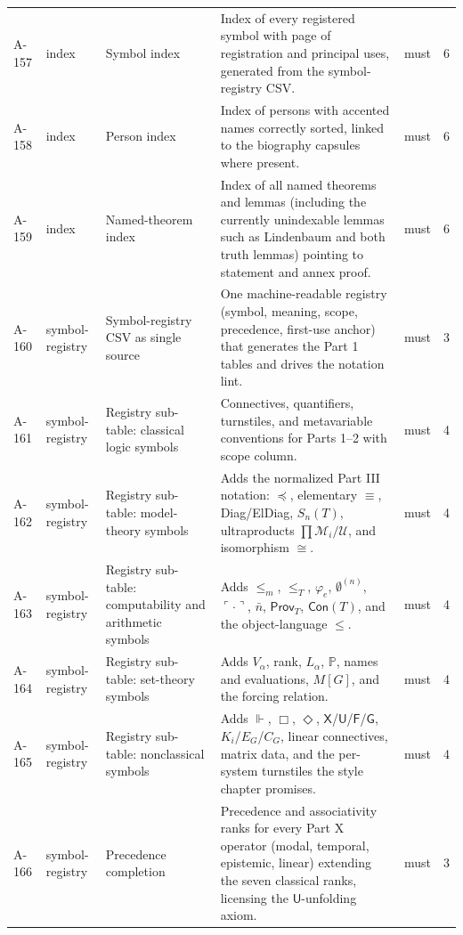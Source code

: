 \begin{longtable}{@{}p{0.45in}p{0.78in}p{2.02in}p{2.6in}p{0.42in}p{0.16in}@{}}
A-157 & index & Symbol index & Index of every registered symbol with page of registration and principal uses, generated from the symbol-registry CSV. & must & 6 \\
A-158 & index & Person index & Index of persons with accented names correctly sorted, linked to the biography capsules where present. & must & 6 \\
A-159 & index & Named-theorem index & Index of all named theorems and lemmas (including the currently unindexable lemmas such as Lindenbaum and both truth lemmas) pointing to statement and annex proof. & must & 6 \\
A-160 & symbol-registry & Symbol-registry CSV as single source & One machine-readable registry (symbol, meaning, scope, precedence, first-use anchor) that generates the Part 1 tables and drives the notation lint. & must & 3 \\
A-161 & symbol-registry & Registry sub-table: classical logic symbols & Connectives, quantifiers, turnstiles, and metavariable conventions for Parts 1--2 with scope column. & must & 4 \\
A-162 & symbol-registry & Registry sub-table: model-theory symbols & Adds the normalized Part III notation: \(\preccurlyeq\), elementary \(\equiv\), Diag/ElDiag, \(S_n(T)\), ultraproducts \(\prod\mathcal M_i/\mathcal U\), and isomorphism \(\cong\). & must & 4 \\
A-163 & symbol-registry & Registry sub-table: computability and arithmetic symbols & Adds \(\leq_m\), \(\leq_T\), \(\varphi_e\), \(\emptyset^{(n)}\), \(\ulcorner\cdot\urcorner\), \(\bar n\), \(\mathsf{Prov}_T\), \(\mathsf{Con}(T)\), and the object-language \(\leq\). & must & 4 \\
A-164 & symbol-registry & Registry sub-table: set-theory symbols & Adds \(V_\alpha\), rank, \(L_\alpha\), \(\mathbb P\), names and evaluations, \(M[G]\), and the forcing relation. & must & 4 \\
A-165 & symbol-registry & Registry sub-table: nonclassical symbols & Adds \(\Vdash\), \(\Box\), \(\Diamond\), \(\mathsf X\)/\(\mathsf U\)/\(\mathsf F\)/\(\mathsf G\), \(K_i\)/\(E_G\)/\(C_G\), linear connectives, matrix data, and the per-system turnstiles the style chapter promises. & must & 4 \\
A-166 & symbol-registry & Precedence completion & Precedence and associativity ranks for every Part X operator (modal, temporal, epistemic, linear) extending the seven classical ranks, licensing the \(\mathsf U\)-unfolding axiom. & must & 3 \\

\end{longtable}
